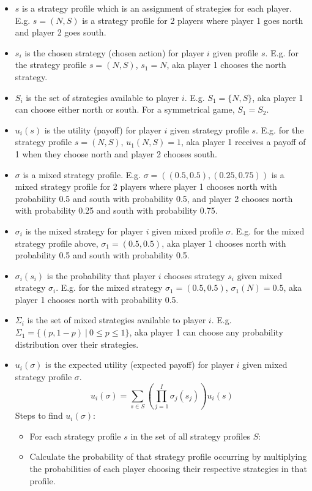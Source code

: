 \documentclass{article}
\begin{document}
\begin{itemize}
  \item $s$ is a strategy profile which is an assignment of strategies for each player. E.g. $s = (N,S)$ is a strategy profile for 2 players where player 1 goes north and player 2 goes south.
  \item $s_i$ is the chosen strategy (chosen action) for player $i$ given profile $s$. E.g. for the strategy profile $s = (N, S)$, $s_1 = N$, aka player 1 chooses the north strategy.
  \item $S_i$ is the set of strategies available to player $i$. E.g. $S_1 = \{N, S\}$, aka player 1 can choose either north or south. For a symmetrical game, $S_1 = S_2$.
  \item $u_i(s)$ is the utility (payoff) for player $i$ given strategy profile $s$. E.g. for the strategy profile $s = (N, S)$, $u_1(N, S) = 1$, aka player 1 receives a payoff of 1 when they choose north and player 2 chooses south.
  \item $\sigma$ is a mixed strategy profile. E.g. $\sigma = ((0.5, 0.5), (0.25, 0.75))$ is a mixed strategy profile for 2 players where player 1 chooses north with probability 0.5 and south with probability 0.5, and player 2 chooses north with probability 0.25 and south with probability 0.75.
  \item $\sigma_i$ is the mixed strategy for player $i$ given mixed profile $\sigma$. E.g. for the mixed strategy profile above, $\sigma_1 = (0.5, 0.5)$, aka player 1 chooses north with probability 0.5 and south with probability 0.5.
 \item $\sigma_i(s_i)$ is the probability that player $i$ chooses strategy $s_i$ given mixed strategy $\sigma_i$. E.g. for the mixed strategy $\sigma_1 = (0.5, 0.5)$, $\sigma_1(N) = 0.5$, aka player 1 chooses north with probability 0.5.
  \item $\Sigma_i$ is the set of mixed strategies available to player $i$. E.g. $\Sigma_1 = \{(p, 1-p)\ |\ 0 \leq p \leq 1\}$, aka player 1 can choose any probability distribution over their strategies.
  \item $u_i(\sigma)$ is the expected utility (expected payoff) for player $i$ given mixed strategy profile $\sigma$.\[u_i(\sigma) = \sum_{s\in S}\left(\prod_{j=1}^I\sigma_j(s_j)\right)u_i(s)\]
  Steps to find $u_i(\sigma)$:
    \begin{itemize}
      \item For each strategy profile $s$ in the set of all strategy profiles $S$:
      \item Calculate the probability of that strategy profile occurring by multiplying the probabilities of each player choosing their respective strategies in that profile.

\end{itemize}
\end{itemize}
\end{document}

